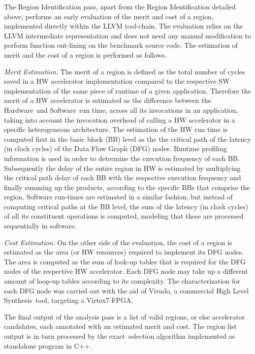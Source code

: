 \documentclass[]{usiinfthesis}
\newcommand{\HW}{{Hardware}}
\newcommand{\SW}{{Software}}
\newcommand{\HLS}{{High Level Synthesis}}
\newcommand{\exact}{\textsf{exact}}
\begin{document}
The Region Identification pass, apart from the Region Identification detailed above, 
performs an early evaluation of the merit and cost of a region, implemented
directly within the LLVM tool-chain. The evaluation relies on the LLVM intermediate
representation and does not need any manual modification to perform function out-lining
on the benchmark source code. 
The estimation of merit and the cost of a region is performed as follows.\par

\emph{Merit Estimation.} 
The merit of a region is defined as the total number of cycles saved in a HW accelerator 
implementation compared to the respective SW implementation of the same piece of runtime 
of a given application. Therefore the merit of a HW accelerator is estimated as the 
difference between the \HW\ and \SW\ run time, across all its invocations in an application,
taking into account the invocation overhead of calling a HW accelerator in a specific 
heterogeneous architecture. The estimation of the HW run time is computed first in the 
basic block (BB) level as the the critical path of the latency (in clock cycles) of the Data 
Flow Graph (DFG) nodes. Runtime profiling information is used in order to determine the execution 
frequency of each BB.
Subsequently the delay of the entire region in HW is estimated by multiplying the critical path
delay of each BB with the respective execution frequency and finally summing up the products, 
according to the specific BBs that comprise the region.
Software run-times are estimated in a similar fashion, but instead of computing critical paths at the BB level, the sum of the latency (in clock cycles) of all its constituent operations is computed, modeling that these are processed sequentially in software.\par

\emph{Cost Estimation.} On the other side of the evaluation, the cost of a region 
is estimated as the area (or HW resources) required to implement its DFG nodes. The area 
is computed as the sum of look-up tables that is required for
the DFG nodes of the respective HW accelerator. Each DFG node may take up a different amount
of loop-up tables according to its complexity. The characterization for each DFG node was carried
out with the aid of Vivado, a commercial \HLS\ tool, targeting a Virtex7 FPGA.\par
The final output of the analysis pass is a list of valid regions, 
or else accelerator candidates, each annotated with an estimated merit and cost.
The region list output is in turn processed by the 
\exact\ selection algorithm implemented as standalone program in C++.
\end{document}
